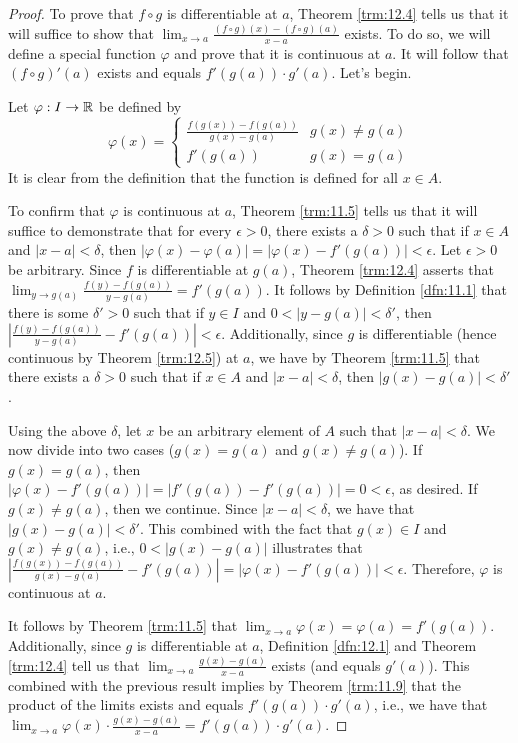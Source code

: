\documentclass[../main.tex]{subfiles}
\begin{document}
\begin{theorem}
\begin{proof}
        To prove that $f\circ g$ is differentiable at $a$, Theorem \ref{trm:12.4} tells us that it will suffice to show that $\lim_{x\to a}\frac{(f\circ g)(x)-(f\circ g)(a)}{x-a}$ exists. To do so, we will define a special function $\varphi$ and prove that it is continuous at $a$. It will follow that $(f\circ g)'(a)$ exists and equals $f'(g(a))\cdot g'(a)$. Let's begin.\par
        Let $\varphi:I\to\mathbb{R}$ be defined by
        \begin{equation*}
            \varphi(x) =
            \begin{cases}
                \frac{f(g(x))-f(g(a))}{g(x)-g(a)} & g(x)\neq g(a)\\
                f'(g(a)) & g(x)=g(a)
            \end{cases}
        \end{equation*}
        It is clear from the definition that the function is defined for all $x\in A$.\par
        To confirm that $\varphi$ is continuous at $a$, Theorem \ref{trm:11.5} tells us that it will suffice to demonstrate that for every $\epsilon>0$, there exists a $\delta>0$ such that if $x\in A$ and $|x-a|<\delta$, then $|\varphi(x)-\varphi(a)|=|\varphi(x)-f'(g(a))|<\epsilon$. Let $\epsilon>0$ be arbitrary. Since $f$ is differentiable at $g(a)$, Theorem \ref{trm:12.4} asserts that $\lim_{y\to g(a)}\frac{f(y)-f(g(a))}{y-g(a)}=f'(g(a))$. It follows by Definition \ref{dfn:11.1} that there is some $\delta'>0$ such that if $y\in I$ and $0<|y-g(a)|<\delta'$, then $|\frac{f(y)-f(g(a))}{y-g(a)}-f'(g(a))|<\epsilon$. Additionally, since $g$ is differentiable (hence continuous by Theorem \ref{trm:12.5}) at $a$, we have by Theorem \ref{trm:11.5} that there exists a $\delta>0$ such that if $x\in A$ and $|x-a|<\delta$, then $|g(x)-g(a)|<\delta'$.\par
        Using the above $\delta$, let $x$ be an arbitrary element of $A$ such that $|x-a|<\delta$. We now divide into two cases ($g(x)=g(a)$ and $g(x)\neq g(a)$). If $g(x)=g(a)$, then $|\varphi(x)-f'(g(a))|=|f'(g(a))-f'(g(a))|=0<\epsilon$, as desired. If $g(x)\neq g(a)$, then we continue. Since $|x-a|<\delta$, we have that $|g(x)-g(a)|<\delta'$. This combined with the fact that $g(x)\in I$ and $g(x)\neq g(a)$, i.e., $0<|g(x)-g(a)|$ illustrates that $|\frac{f(g(x))-f(g(a))}{g(x)-g(a)}-f'(g(a))|=|\varphi(x)-f'(g(a))|<\epsilon$. Therefore, $\varphi$ is continuous at $a$.\par
        It follows by Theorem \ref{trm:11.5} that $\lim_{x\to a}\varphi(x)=\varphi(a)=f'(g(a))$. Additionally, since $g$ is differentiable at $a$, Definition \ref{dfn:12.1} and Theorem \ref{trm:12.4} tell us that $\lim_{x\to a}\frac{g(x)-g(a)}{x-a}$ exists (and equals $g'(a)$). This combined with the previous result implies by Theorem \ref{trm:11.9} that the product of the limits exists and equals $f'(g(a))\cdot g'(a)$, i.e., we have that $\lim_{x\to a}\varphi(x)\cdot\frac{g(x)-g(a)}{x-a}=f'(g(a))\cdot g'(a)$.\par

\end{proof}
\end{theorem}
\end{document}
